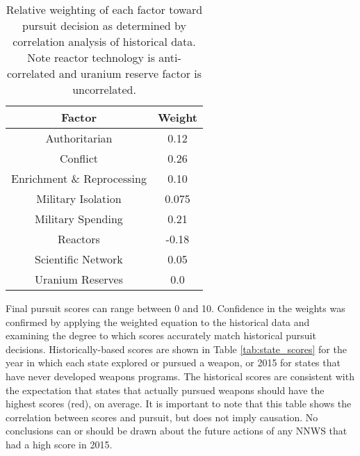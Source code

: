\begin{table}
\centering
\begin{tabular}{|c|c|}
\hline
\textbf{Factor}        & \textbf{Weight} \\
\hline
Authoritarian   & 0.12 \\
Conflict  & 0.26 \\
Enrichment \& Reprocessing & 0.10 \\
Military Isolation & 0.075 \\
Military Spending & 0.21 \\
Reactors           & -0.18 \\
Scientific Network & 0.05 \\
Uranium Reserves &  0.0 \\
\hline
\end{tabular}
\caption{Relative weighting of each factor toward pursuit decision as determined by correlation analysis of historical data. Note reactor technology is anti-correlated and uranium reserve factor is uncorrelated.}
\label{tab:factor_weights}
\end{table}

Final pursuit scores can range between 0 and 10.  Confidence in the weights was confirmed by applying the weighted equation to the historical data and examining the degree to which scores accurately match historical pursuit decisions.  Historically-based scores are shown in Table \ref{tab:state_scores} for the year in which each state explored or pursued a weapon, or 2015 for states that have never developed weapons programs. The historical scores are consistent with the expectation that states that actually pursued weapons should have the highest scores (red), on average. It is important to note that this table shows the correlation between scores and pursuit, but does not imply causation. No conclusions can or should be drawn about the future actions of any \gls{NNWS} that had a high score in 2015.

